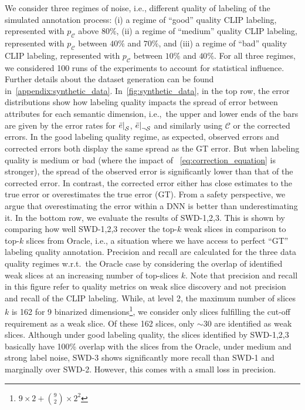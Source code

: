 We consider three regimes of noise, i.e., different quality of labeling of the simulated annotation process:
(i) a regime of ``good'' quality CLIP labeling, represented with $p_\mathcal C$ above $80\%$, (ii) a regime of ``medium'' quality CLIP labeling, represented with $p_\mathcal C$ between $40\%$ and $70\%$, and (iii) a regime of ``bad'' quality CLIP labeling, represented with $p_\mathcal C$ between $10\%$ and $40\%$.
For all three regimes, we considered 100 runs of the experiments to account for statistical influence. Further details about the dataset generation can be found in~\cref{appendix:synthetic_data}.
In~\cref{fig:synthetic_data}, in the top row, the error distributions show how labeling quality impacts the spread of error between attributes for each semantic dimension, i.e.,\ the upper and lower ends of the bars are given by the error rates for $\restr{\bar{e}}{\mathcal S}$, $\restr{\bar{e}}{\neg\mathcal S}$ and similarly using $\mathcal C$ or the corrected errors. In the good labeling quality regime, as expected, observed errors and corrected errors both display the same spread as the GT error. But when labeling quality is medium or bad (where the impact of ~\cref{eq:correction_equation} is stronger), the spread of the observed error is significantly lower than that of the corrected error. In contrast, the corrected error either has close estimates to the true error or overestimates the true error (GT). From a safety perspective, we argue that overestimating the error within a DNN is better than underestimating it. In the bottom row, we evaluate the results of SWD-1,2,3. This is shown by comparing how well SWD-1,2,3 recover the top-$k$ weak slices in comparison to top-$k$ slices from Oracle, i.e., a situation where we have access to perfect ``GT'' labeling quality annotation.
Precision and recall are calculated for the three data quality regimes w.r.t.\ the Oracle case by considering the overlap of identified weak slices at an increasing number of top-slices $k$. Note that precision and recall in this figure refer to quality metrics on weak slice discovery and not precision and recall of the CLIP labeling.
While, at level 2, the maximum number of slices $k$ is 162 for 9 binarized dimensions\footnote{$9 \times 2 + \binom{9}{2}\times{2^2}$}, we consider only slices fulfilling the cut-off requirement as a weak slice. Of these 162 slices, only $\sim 30$ are identified as weak slices. Although under good labeling quality, the slices identified by SWD-1,2,3 basically have 100\% overlap with the slices from the Oracle, under medium and strong label noise, SWD-3 shows significantly more recall than SWD-1 and marginally over SWD-2. However, this comes with a small loss in precision. 
